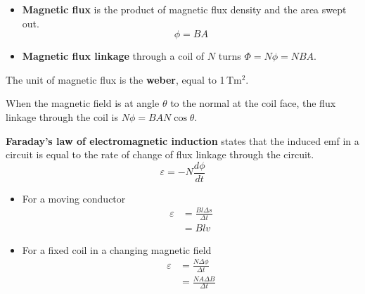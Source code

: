 \begin{itemize}
    \item \textbf{Magnetic flux} is the product of magnetic flux density and the area swept out.
        $$\phi=BA$$
    \item \textbf{Magnetic flux linkage} through a coil of $N$ turns $\Phi=N\phi=NBA$.
\end{itemize}

The unit of magnetic flux is the \textbf{weber}, equal to 1\,Tm$^2$.

When the magnetic field is at angle $\theta$ to the normal at the coil face, the flux linkage through the coil is $N\phi=BAN\cos\theta$.

\textbf{Faraday's law of electromagnetic induction} states that the induced emf in a circuit is equal to the rate of change of flux linkage through the circuit.
$$\varepsilon=-N\frac{d\phi}{dt}$$

\begin{itemize}
    \item For a moving conductor
        \begin{align*}
            \varepsilon&=\frac{Bl\Delta s}{\Delta t}\\
                       &=Blv
        \end{align*}
    \item For a fixed coil in a changing magnetic field
        \begin{align*}
            \varepsilon&=\frac{N\Delta\phi}{\Delta t}\\
                       &=\frac{NA\Delta B}{\Delta t}
        \end{align*}
\end{itemize}

